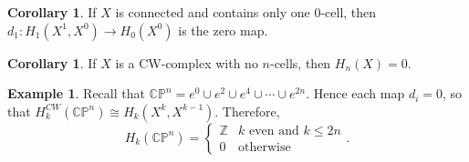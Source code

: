 \documentclass[10pt,letterpaper,cm]{nupset}
\theoremstyle{definition}
\newtheorem{exmp}[definition]{Example}
\theoremstyle{theorem}
\newtheorem{corollary}[definition]{Corollary}
\theoremstyle{remark}
\newcommand{\CP}{\mathbb{CP}}
\newcommand{\Z}{\mathbb Z}
\newcommand{\1}{\mathbb{1}}
\newcommand{\0}{\vec 0}
\begin{document}
\begin{corollary}\label{c19}
If $X$ is connected and contains only one $0$-cell, then $d_1 : H_1(X^1, X^0) \to H_0(X^0)$ is the zero map.
\end{corollary}

\begin{corollary}
If $X$ is a CW-complex with no $n$-cells, then $H_n(X) =0$.
\end{corollary}

\begin{exmp}
Recall that $\CP^n = e^0 \cup e^2 \cup e^4 \cup \cdots \cup e^{2n}$. Hence each map $d_i =0$, so that $H_k^{CW}(\CP^n)\cong H_k(X^k, X^{k-1})$. Therefore, $$H_k(\CP^n) = \begin{cases}  \Z & k \text{ even and } k\leq 2n  \\ 0 & \text{otherwise}  \end{cases}.$$
\end{exmp}
\end{document}
